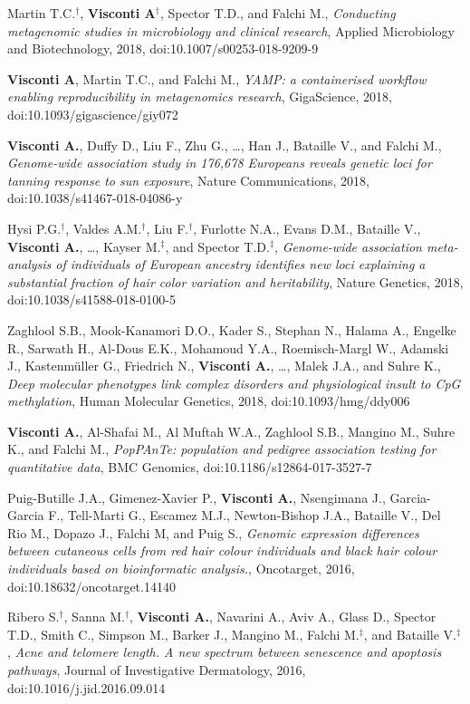 {\begin{itemize}
		 Martin T.C.$^{\textbf{$\dag $}}$, \textbf{Visconti A}$^{\textbf{$\dag $}}$, Spector T.D., and Falchi M., \emph{Conducting metagenomic studies in microbiology and clinical research}, Applied Microbiology and Biotechnology, 2018, doi:10.1007/s00253-018-9209-9
				
		 \textbf{Visconti A}, Martin T.C., and Falchi M., \emph{YAMP: a containerised workflow enabling reproducibility in metagenomics research}, GigaScience, 2018, doi:10.1093/gigascience/giy072	
			
		 \textbf{Visconti A.}, Duffy D., Liu F., Zhu G., \dots, Han J., Bataille V., and Falchi M., \emph{Genome-wide association study in 176,678 Europeans reveals genetic loci for tanning response to sun exposure}, Nature Communications, 2018, doi:10.1038/s41467-018-04086-y	
			
		 Hysi P.G.$^{\textbf{$\dag $}}$, Valdes A.M.$^{\textbf{$\dag $}}$, Liu F.$^{\textbf{$\dag $}}$, Furlotte N.A., Evans D.M., Bataille V., \textbf{Visconti A.}, \dots, Kayser M.$^{\textbf{$\ddag $}}$, and Spector T.D.$^{\textbf{$\ddag $}}$, \emph{Genome-wide association meta-analysis of individuals of European ancestry identifies new loci explaining a substantial fraction of hair color variation and heritability}, Nature Genetics, 2018, doi:10.1038/s41588-018-0100-5
			
		 Zaghlool S.B., Mook-Kanamori D.O., Kader S., Stephan N., Halama A., Engelke R., Sarwath H., Al-Dous E.K., Mohamoud Y.A., Roemisch-Margl W., Adamski J., Kastenmüller G., Friedrich N., \textbf{Visconti A.}, \dots, Malek J.A., and Suhre K., \emph{Deep molecular phenotypes link complex disorders and physiological insult to CpG methylation}, Human Molecular Genetics, 2018, doi:10.1093/hmg/ddy006
				
		 \textbf{Visconti A.}, Al-Shafai M.,  Al Muftah W.A.,  Zaghlool S.B., Mangino M., Suhre K., and Falchi M., \emph{PopPAnTe: population and pedigree association testing for quantitative data}, BMC Genomics, doi:10.1186/s12864-017-3527-7	
				
		 Puig-Butille J.A., Gimenez-Xavier P., \textbf{Visconti A.}, Nsengimana J., Garcia-Garcia F., Tell-Marti G., Escamez M.J., Newton-Bishop J.A., Bataille V., Del Rio M., Dopazo J., Falchi M, and Puig S., \emph{Genomic expression differences between cutaneous cells from red hair colour individuals and black hair colour individuals based on bioinformatic analysis.}, Oncotarget, 2016, doi:10.18632/oncotarget.14140

		 Ribero S.$^{\textbf{$\dag $}}$, Sanna M.$^{\textbf{$\dag $}}$, \textbf{Visconti A.}, Navarini A., Aviv A., Glass D., Spector T.D., Smith C., Simpson M., Barker J., Mangino M., Falchi M.$^{\textbf{$\ddag $}}$, and Bataille V.$^{\textbf{$\ddag $}}$, \emph{Acne and telomere length. A new spectrum between senescence and apoptosis pathways}, Journal of Investigative Dermatology, 2016, doi:10.1016/j.jid.2016.09.014


	\end{itemize}
}

